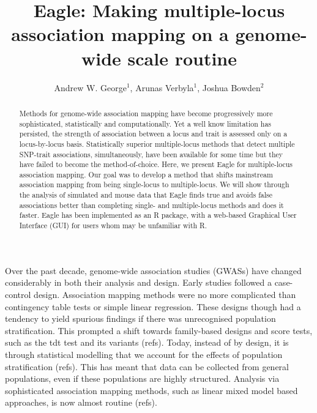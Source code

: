 \documentclass{article}
\begin{document}
\title{Eagle: Making multiple-locus association mapping on a genome-wide scale routine}
\author{Andrew W. George$^1$, Arunas Verbyla$^1$, Joshua Bowden$^2$}

\maketitle





\begin{abstract}

Methods for genome-wide association mapping have become progressively more sophisticated, statistically and computationally. Yet a well know limitation has persisted, the strength of association between a locus and trait is assessed only on a locus-by-locus basis. Statistically superior multiple-locus methods that detect multiple SNP-trait associations, simultaneously, have been available for some time but they have failed to become the method-of-choice. 
Here, we present Eagle for multiple-locus association mapping. Our goal was to develop a method that shifts mainstream association mapping from being single-locus to multiple-locus. We will show through the analysis of simulated and mouse data that Eagle finds true and avoids false 
associations better than completing single- and multiple-locus methods and does it faster. Eagle has been implemented as an R package, with a web-based Graphical User Interface (GUI) for users whom may be unfamiliar with R.
\end{abstract}


Over the past decade,  genome-wide association studies (GWASs) have changed considerably in both their analysis and design. Early studies
 followed a case-control design. Association mapping methods were no more complicated than contingency table tests or simple 
linear regression. These designs though had a tendency to yield spurious findings if there was unrecognised population stratification. This prompted a shift towards family-based designs and score tests, such as the tdt test and its variants (refs). Today, instead of by design, it is through statistical modelling that we account for the effects of population stratification (refs). This has meant that data can be collected from general populations, even if these populations are highly structured. Analysis via sophisticated association mapping methods, such as linear mixed model based approaches,  is now almost routine (refs).
\end{document}
